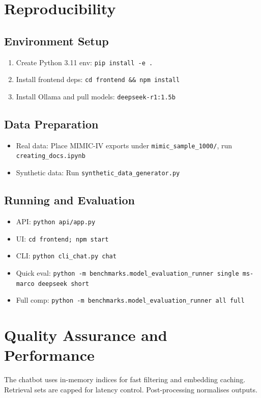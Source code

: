 \section{Reproducibility}

\subsection{Environment Setup}
\begin{enumerate}
  \item Create Python 3.11 env: \texttt{pip install -e .}
  \item Install frontend deps: \texttt{cd frontend \&\& npm install}
  \item Install Ollama and pull models: \texttt{deepseek-r1:1.5b}
\end{enumerate}

\subsection{Data Preparation}
\begin{itemize}
  \item Real data: Place MIMIC-IV exports under \texttt{mimic\_sample\_1000/}, run \texttt{creating\_docs.ipynb}
  \item Synthetic data: Run \texttt{synthetic\_data\_generator.py}
\end{itemize}

\subsection{Running and Evaluation}
\begin{itemize}
  \item API: \texttt{python api/app.py}
  \item UI: \texttt{cd frontend; npm start}
  \item CLI: \texttt{python cli\_chat.py chat}
  \item Quick eval: \texttt{python -m benchmarks.model\_evaluation\_runner single ms-marco deepseek short}
  \item Full comp: \texttt{python -m benchmarks.model\_evaluation\_runner all full}
\end{itemize}

\section{Quality Assurance and Performance}
The chatbot uses in-memory indices for fast filtering and embedding caching. Retrieval sets are capped for latency control. Post-processing normalises outputs.

